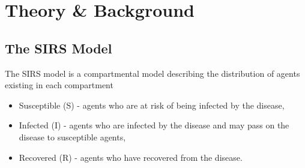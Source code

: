 \section{Theory \& Background}
\subsection{The SIRS Model}

\label{section: SIRStheory}
The SIRS model is a compartmental model describing the distribution of agents existing in each compartment

\begin{itemize}
    \item Susceptible (S) - agents who are at risk of being infected by the disease,
    \item Infected (I) - agents who are infected by the disease and may pass on the disease to susceptible agents,
    \item Recovered (R) - agents who have recovered from the disease.
    
\end{itemize}

